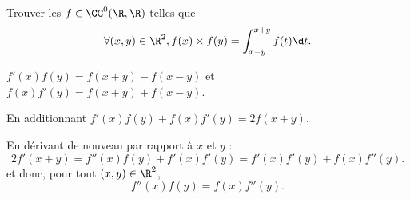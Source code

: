 \begin{enonce}
\begin{exercise}[ID={RMS119 E732 MinesPont PC 2008},subtitle={},tags={}, difficulty={0}]
Trouver les $f\in\CC^0(\R,\R)$ telles que
\begin{equation*}
\forall (x,y)\in\R^2, f(x)\times f(y)=\int_{x-y}^{x+y} f(t)\d t.
\end{equation*}
\end{exercise}
\begin{solution}
$f'(x)f(y)=f(x+y)-f(x-y)$ et $f(x)f'(y)=f(x+y)+f(x-y)$.

En additionnant $f'(x)f(y)+f(x)f'(y)=2f(x+y)$.

En dérivant de nouveau par rapport à $x$ et $y$ :
\begin{equation*}
  2f'(x+y)=f''(x)f(y)+f'(x)f'(y)=f'(x)f'(y)+f(x)f''(y).
\end{equation*}
et donc, pour tout $(x,y)\in\R^2$,
\begin{equation*}
  f''(x)f(y)=f(x)f''(y).
\end{equation*}
\end{solution}
\end{enonce}
